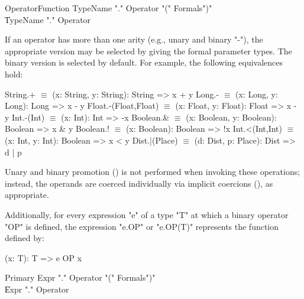 \begin{grammar}
OperatorFunction
        \: TypeName \xcd"." Operator \xcd"(" Formals\opt \xcd")" \\
        \| TypeName \xcd"." Operator \\
\end{grammar}

If an operator has more than one arity (e.g., unary and binary
\xcd"-"), the appropriate version may be selected by giving the
formal parameter types.  The binary version is selected by
default.
For example, the following equivalences hold:

\begin{xtenmath}
String.+             $\equiv$ (x: String, y: String): String => x + y
Long.-               $\equiv$ (x: Long, y: Long): Long => x - y
Float.-(Float,Float) $\equiv$ (x: Float, y: Float): Float => x - y
Int.-(Int)           $\equiv$ (x: Int): Int => -x
Boolean.&            $\equiv$ (x: Boolean, y: Boolean): Boolean => x & y
Boolean.!            $\equiv$ (x: Boolean): Boolean => !x
Int.<(Int,Int)       $\equiv$ (x: Int, y: Int): Boolean => x < y
Dist.|(Place)        $\equiv$ (d: Dist, p: Place): Dist => d | p
\end{xtenmath}

Unary and binary promotion () is not performed
when invoking these
operations; instead, the operands are coerced individually via implicit
coercions (), as appropriate.

Additionally, for every expression \xcd"e" of a type \xcd"T" at which a binary
operator \xcd"OP" is defined, the expression \xcd"e.OP" or
\xcd"e.OP(T)" represents the function
defined by:

\begin{xten}
(x: T): T => { e OP x }
\end{xten}

\begin{grammar}
Primary \: Expr \xcd"." Operator \xcd"(" Formals\opt \xcd")" \\
        \| Expr \xcd"." Operator \\
\end{grammar}



